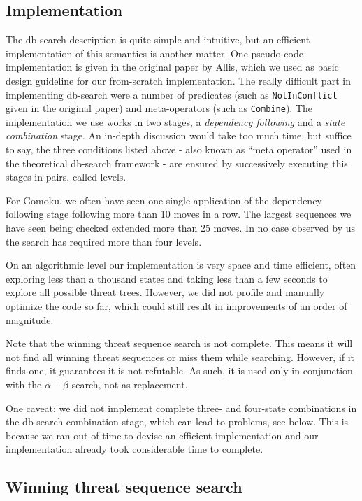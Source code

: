 \documentclass[10pt]{article}
\begin{document}
\subsection{Implementation}

The db-search description is quite simple and intuitive, but an efficient
implementation of this semantics is another matter.  One pseudo-code
implementation is given in the original paper by Allis, which we used as basic
design guideline for our from-scratch implementation.  The really difficult
part in implementing db-search were a number of predicates (such as
\verb|NotInConflict| given in the original paper) and meta-operators
(such as \verb|Combine|).  The implementation we use works in two stages, a
{\em dependency following} and a {\em state combination} stage.  An
in-depth discussion would take too much time, but suffice to say, the three
conditions listed above - also known as ``meta operator'' used in the
theoretical db-search framework - are ensured by successively executing this
stages in pairs, called levels.

For Gomoku, we often have seen one single application of the dependency
following stage following more than 10 moves in a row.  The largest sequences
we have seen being checked extended more than 25 moves.  In no case observed
by us the search has required more than four levels.

On an algorithmic level our implementation is very space and time efficient,
often exploring less than a thousand states and taking less than a few seconds
to explore all possible threat trees.  However, we did not profile and
manually optimize the code so far, which could still result in improvements of
an order of magnitude.

Note that the winning threat sequence search is not complete.  This means it
will not find all winning threat sequences or miss them while searching.
However, if it finds one, it guarantees it is not refutable.  As such, it is
used only in conjunction with the $\alpha-\beta$ search, not as replacement.

One caveat: we did not implement complete three- and four-state combinations
in the db-search combination stage, which can lead to problems, see below.
This is because we ran out of time to devise an efficient implementation and
our implementation already took considerable time to complete.


\subsection{Winning threat sequence search}
\end{document}
